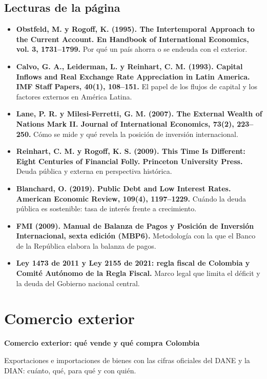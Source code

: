 \section*{Lecturas de la página}
\begin{itemize}\small
\item \textbf{Obstfeld, M. y Rogoff, K. (1995). The Intertemporal Approach to the Current Account. En Handbook of International Economics, vol. 3, 1731–1799.} Por qué un país ahorra o se endeuda con el exterior.
\item \textbf{Calvo, G. A., Leiderman, L. y Reinhart, C. M. (1993). Capital Inflows and Real Exchange Rate Appreciation in Latin America. IMF Staff Papers, 40(1), 108–151.} El papel de los flujos de capital y los factores externos en América Latina.
\item \textbf{Lane, P. R. y Milesi-Ferretti, G. M. (2007). The External Wealth of Nations Mark II. Journal of International Economics, 73(2), 223–250.} Cómo se mide y qué revela la posición de inversión internacional.
\item \textbf{Reinhart, C. M. y Rogoff, K. S. (2009). This Time Is Different: Eight Centuries of Financial Folly. Princeton University Press.} Deuda pública y externa en perspectiva histórica.
\item \textbf{Blanchard, O. (2019). Public Debt and Low Interest Rates. American Economic Review, 109(4), 1197–1229.} Cuándo la deuda pública es sostenible: tasa de interés frente a crecimiento.
\item \textbf{FMI (2009). Manual de Balanza de Pagos y Posición de Inversión Internacional, sexta edición (MBP6).} Metodología con la que el Banco de la República elabora la balanza de pagos.
\item \textbf{Ley 1473 de 2011 y Ley 2155 de 2021: regla fiscal de Colombia y Comité Autónomo de la Regla Fiscal.} Marco legal que limita el déficit y la deuda del Gobierno nacional central.
\end{itemize}

\chapter{Comercio exterior}
\label{atlas:comercio}

{\large\sffamily\bfseries Comercio exterior: qué vende y qué compra Colombia\par}\medskip

Exportaciones e importaciones de bienes con las cifras oficiales del DANE y la DIAN: cuánto, qué, para qué y con quién.

